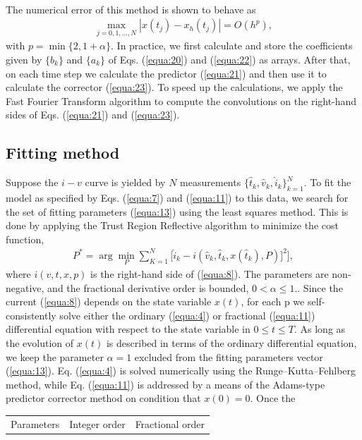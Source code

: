 \documentclass[10pt]{article}
\begin{document}
\begin{multicols}{2}
\begin{align}
\end{align}
The numerical error of this method is shown to behave as
\begin{align}
   \max_{j=0,1,...,N} |x(t_j)-x_h(t_j)|=O(h^p), \label{equa:24}
\end{align}
with $p=\min\{2,1+\alpha\}$. In practice, we first calculate and store the coefficients given by $\{b_k\}$ and $\{a_k\}$ of Eqs. (\ref{equa:20}) and (\ref{equa:22}) as arrays. After that, on each time step we calculate the predictor (\ref{equa:21}) and then use it to calculate the corrector (\ref{equa:23}). To speed up the calculations, we apply the Fast Fourier Transform algorithm to compute the convolutions on the right-hand sides of Eqs. (\ref{equa:21}) and (\ref{equa:23}).
\par
{\centering \subsection{ \bfseries Fitting method}}
Suppose the $i-v$ curve is yielded by $N$ measurements $\{\hat{t}_k, \hat{v}_k, \hat{i}_k\}_{k=1}^N$. To fit the model as specified by Eqs. (\ref{equa:7}) and (\ref{equa:11}) to this data, we search for the set of fitting parameters (\ref{equa:13}) using the least squares method. This is done by applying the Trust Region Reflective algorithm to minimize the cost function,
\begin{align}
   P^* = \arg \min_P \sum_{K=1}^N \biggl[\hat{i}_k-i(\hat{v}_k,\hat{t}_k, x(\hat{t}_k),P)]^2 \biggr],
\end{align}
where $i(v, t, x, p)$ is the right-hand side of (\ref{equa:8}). The parameters are non-negative, and the fractional derivative order is bounded, $0 < \alpha \le 1.$. Since the current (\ref{equa:8}) depends on the state variable $x(t)$, for each p we self-consistently solve either the ordinary (\ref{equa:4}) or fractional (\ref{equa:11}) differential equation with respect to the state variable in $0 \le t \le T$. As long as the evolution of $x(t)$ is described in terms of the ordinary differential equation, we keep the parameter $\alpha = 1$ excluded from the fitting parameters vector (\ref{equa:13}). Eq. (\ref{equa:4}) is solved numerically using the Runge–Kutta–Fehlberg method, while Eq. (\ref{equa:11}) is addressed by a means of the Adams-type predictor corrector method on condition that $x(0) = 0$. Once the 
{
\begin{center}
\begin{tabular}{c c c}
    \hline
    \hline
    Parameters & Integer order & Fractional order \\

\end{tabular}
\end{center}}
\end{multicols}
\end{document}
